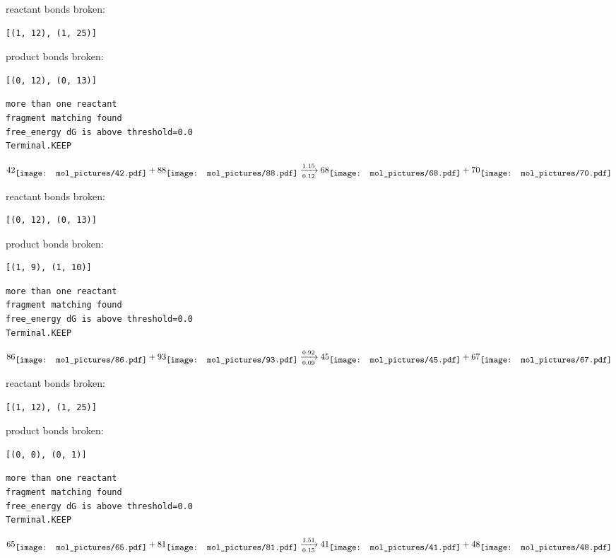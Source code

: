 \documentclass{article}
\begin{document}
reactant bonds broken:\begin{verbatim}
[(1, 12), (1, 25)]
\end{verbatim}
product bonds broken:\begin{verbatim}
[(0, 12), (0, 13)]
\end{verbatim}




\vspace{1cm}
\begin{verbatim}
more than one reactant
fragment matching found
free_energy dG is above threshold=0.0
Terminal.KEEP
\end{verbatim}
$$
42
\raisebox{-.5\height}{\texttt{[image: mol\_pictures/42.pdf]}}
+
88
\raisebox{-.5\height}{\texttt{[image: mol\_pictures/88.pdf]}}
\xrightarrow[0.12]{1.15}
68
\raisebox{-.5\height}{\texttt{[image: mol\_pictures/68.pdf]}}
+
70
\raisebox{-.5\height}{\texttt{[image: mol\_pictures/70.pdf]}}
$$


reactant bonds broken:\begin{verbatim}
[(0, 12), (0, 13)]
\end{verbatim}
product bonds broken:\begin{verbatim}
[(1, 9), (1, 10)]
\end{verbatim}




\vspace{1cm}
\begin{verbatim}
more than one reactant
fragment matching found
free_energy dG is above threshold=0.0
Terminal.KEEP
\end{verbatim}
$$
86
\raisebox{-.5\height}{\texttt{[image: mol\_pictures/86.pdf]}}
+
93
\raisebox{-.5\height}{\texttt{[image: mol\_pictures/93.pdf]}}
\xrightarrow[0.09]{0.92}
45
\raisebox{-.5\height}{\texttt{[image: mol\_pictures/45.pdf]}}
+
67
\raisebox{-.5\height}{\texttt{[image: mol\_pictures/67.pdf]}}
$$


reactant bonds broken:\begin{verbatim}
[(1, 12), (1, 25)]
\end{verbatim}
product bonds broken:\begin{verbatim}
[(0, 0), (0, 1)]
\end{verbatim}




\vspace{1cm}
\begin{verbatim}
more than one reactant
fragment matching found
free_energy dG is above threshold=0.0
Terminal.KEEP
\end{verbatim}
$$
65
\raisebox{-.5\height}{\texttt{[image: mol\_pictures/65.pdf]}}
+
81
\raisebox{-.5\height}{\texttt{[image: mol\_pictures/81.pdf]}}
\xrightarrow[0.15]{1.51}
41
\raisebox{-.5\height}{\texttt{[image: mol\_pictures/41.pdf]}}
+
48
\raisebox{-.5\height}{\texttt{[image: mol\_pictures/48.pdf]}}
$$
\end{document}
